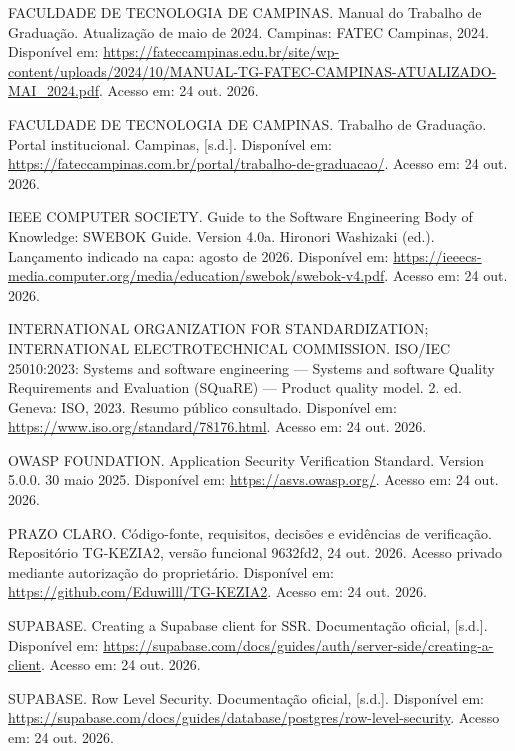 \begin{singlespace}
\label{ref:FATECMANUAL}FACULDADE DE TECNOLOGIA DE CAMPINAS. Manual do Trabalho de Graduação. Atualização de maio de 2024. Campinas: FATEC Campinas, 2024. Disponível em: \url{https://fateccampinas.edu.br/site/wp-content/uploads/2024/10/MANUAL-TG-FATEC-CAMPINAS-ATUALIZADO-MAI_2024.pdf}. Acesso em: 24 out. 2026.\par
{}\label{ref:FATECPORTAL}FACULDADE DE TECNOLOGIA DE CAMPINAS. Trabalho de Graduação. Portal institucional. Campinas, [s.d.]. Disponível em: \url{https://fateccampinas.com.br/portal/trabalho-de-graduacao/}. Acesso em: 24 out. 2026.\par
{}\label{ref:SWEBOK}IEEE COMPUTER SOCIETY. Guide to the Software Engineering Body of Knowledge: SWEBOK Guide. Version 4.0a. Hironori Washizaki (ed.). Lançamento indicado na capa: agosto de 2026. Disponível em: \url{https://ieeecs-media.computer.org/media/education/swebok/swebok-v4.pdf}. Acesso em: 24 out. 2026.\par
{}\label{ref:ISO25010}INTERNATIONAL ORGANIZATION FOR STANDARDIZATION; INTERNATIONAL ELECTROTECHNICAL COMMISSION. ISO/IEC 25010:2023: Systems and software engineering --- Systems and software Quality Requirements and Evaluation (SQuaRE) --- Product quality model. 2. ed. Geneva: ISO, 2023. Resumo público consultado. Disponível em: \url{https://www.iso.org/standard/78176.html}. Acesso em: 24 out. 2026.\par
{}\label{ref:ASVS}OWASP FOUNDATION. Application Security Verification Standard. Version 5.0.0. 30 maio 2025. Disponível em: \url{https://asvs.owasp.org/}. Acesso em: 24 out. 2026.\par
{}\label{ref:PROJETO}PRAZO CLARO. Código-fonte, requisitos, decisões e evidências de verificação. Repositório TG-KEZIA2, versão funcional 9632fd2, 24 out. 2026. Acesso privado mediante autorização do proprietário. Disponível em: \url{https://github.com/Eduwilll/TG-KEZIA2}. Acesso em: 24 out. 2026.\par
{}\label{ref:SUPABASESSR}SUPABASE. Creating a Supabase client for SSR. Documentação oficial, [s.d.]. Disponível em: \url{https://supabase.com/docs/guides/auth/server-side/creating-a-client}. Acesso em: 24 out. 2026.\par
{}\label{ref:SUPABASERLS}SUPABASE. Row Level Security. Documentação oficial, [s.d.]. Disponível em: \url{https://supabase.com/docs/guides/database/postgres/row-level-security}. Acesso em: 24 out. 2026.\par

\end{singlespace}
